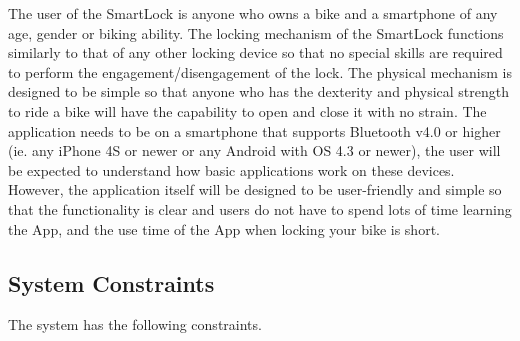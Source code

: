 \documentclass[12pt]{article}
\begin{document}
The user of the SmartLock is anyone who owns a bike and a smartphone of any age, gender or biking ability.  The locking mechanism of the SmartLock functions similarly to that of any other locking device so that no special skills are required to perform the engagement/disengagement of the lock.  The physical mechanism is designed to be simple so that anyone who has the dexterity and physical strength to ride a bike will have the capability to open and close it with no strain.  The application needs to be on a smartphone that supports Bluetooth v4.0 or higher (ie. any iPhone 4S or newer or any Android with OS 4.3 or newer), the user will be expected to understand how basic applications work on these devices.  However, the application itself will be designed to be user-friendly and simple so that the functionality is clear and users do not have to spend lots of time learning the App, and the use time of the App when locking your bike is short. 

\subsection{System Constraints}

The system has the following constraints.
\end{document}
